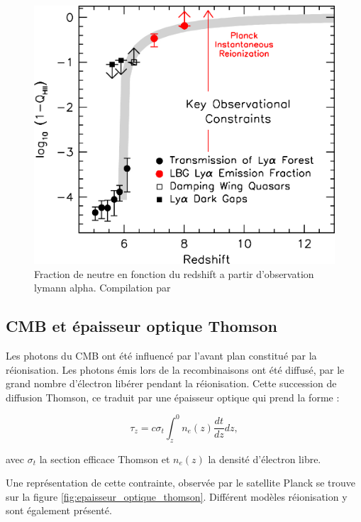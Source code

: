\begin{figure}[bth]
        \includegraphics[width=.95\linewidth]{img/01/xionconstrains.jpg} 
        \caption{Fraction de neutre en fonction du redshift a partir d'observation lymann alpha.
        Compilation par \cite{2015ApJ...811..140B}}
 		\label{fig:compile_constrains}
\end{figure}




\subsection{CMB et épaisseur optique Thomson}


Les photons du CMB ont été influencé par l'avant plan constitué par la réionisation.
Les photons émis lors de la recombinaisons ont été diffusé, par le grand nombre d'électron libérer pendant la réionisation.
Cette succession de diffusion Thomson, ce traduit par une épaisseur optique qui prend la forme : 

\begin{equation}
\tau_z = c \sigma_t \int_z^0 n_e (z) \frac{dt}{dz} dz,
\end{equation}

avec $\sigma_t$ la section efficace Thomson et $n_e (z)$ la densité d'électron libre.

Une représentation de cette contrainte, observée par le satellite Planck se trouve sur la figure \ref{fig:epaisseur_optique_thomson}.
Différent modèles réionisation y sont également présenté.


